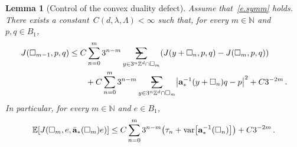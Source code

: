 \documentclass[11pt]{article} %
\makeatletter
\let\oldsquare\square %
\renewcommand{\square}{\oldsquare}
\numberwithin{equation}{section}
\newtheorem{lemma}[theorem]{Lemma}
\theoremstyle{definition}
\let\originalleft\left
\let\originalright\right
\renewcommand{\left}{\mathopen{}\mathclose\bgroup\originalleft}
\renewcommand{\right}{\aftergroup\egroup\originalright}
\newcommand*{\N}{\ensuremath{\mathbb{N}}}
\newcommand*{\Zd}{\ensuremath{\mathbb{Z}^d}}
\renewcommand{\a}{\mathbf{a}}
\newcommand{\ahom}{\bar{\a}}
\newcommand{\cu}{\square}
\newcommand{\E}{\mathbb{E}}
\DeclareMathOperator{\var}{var}
\newcommand{\avsum}{\mathop{\mathpalette\avsuminner\relax}\displaylimits}
\newcommand\avsuminner[2]{%
  {\sbox0{$\m@th#1\sum$}%
   \vphantom{\usebox0}%
   \ooalign{%
     \hidewidth
     \smash{\,\rule[.23em]{8.8pt}{1.1pt} \relax}%
     \hidewidth\cr
     $\m@th#1\sum$\cr
   }%
  }%
}
\makeatother
\begin{document}
\begin{lemma}
[Control of the convex duality defect]
\label{l.flatness.rules}
Assume that~\eqref{e.symm} holds. 
There exists a constant~$C(d,\lambda,\Lambda)<\infty$ such that, for every $m\in\N$ and $p,q\in B_1$, 
\begin{align}
\label{e.flatness.quenched}
J(\cu_{m-1},p,q) 
&
\leq 
C
\sum_{n=0}^{{m}} 3^{n-m} 
\avsum_{y\in 3^{n}\Zd\cap \cu_m} 
( J(y+\cu_{n},p,q) - J (\cu_m,p,q) )
\notag \\ & \qquad 
+
C\sum_{n=0}^{{m}} 3^{n-m} 
\avsum_{y\in 3^n\Zd\cap \cu_{m}} 
\left| \a_*^{-1}(y+\cu_n) q - p\right|^2
+C3^{-2m}
\,.
\end{align}
In particular, for every $m\in\N$ and $e\in  B_1$, 
\begin{align}
\label{e.flatness.rules}
\E \left[ J(\cu_m,e,\ahom_*(\cu_m)e) \right]
\leq 
C 
\sum_{n=0}^{m} 3^{n-m} 
\left( \tau_n + \var\left[ \a_*^{-1}(\cu_n) \right] \right)
+C 3^{-2m}\,. 
\end{align}
\end{lemma}
\end{document}
